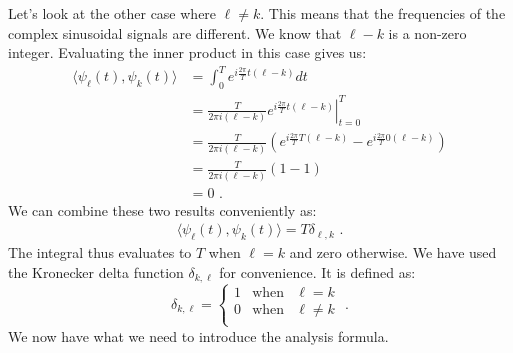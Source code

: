 Let's look at the other case where $\ell \ne k$. This means that the frequencies of the complex
sinusoidal signals are different. We know that $\ell - k$ is a non-zero integer.
Evaluating the inner product in this case gives us:
\begin{align}
  \langle \psi_\ell(t), \psi_k(t) \rangle & = \int_0^T  e^{i\frac{2\pi}{T}t(\ell-k)} dt                                                           \\
                                          & = \left.\frac{T}{2\pi i (\ell-k)} e^{i\frac{2\pi}{T}t(\ell-k)} \right\vert_{t=0}^{T}                  \\
                                          & = \frac{T}{2\pi i (\ell-k)}\left( e^{i\frac{2\pi}{T}T(\ell-k)} - e^{i\frac{2\pi}{T}0(\ell-k)} \right) \\
                                          & = \frac{T}{2\pi i (\ell-k)}( 1 - 1 )                                                                  \\
                                          & = 0 \,\,.
\end{align}
We can combine these two results conveniently as:
\begin{align}
  \langle \psi_\ell(t), \psi_k(t) \rangle = T\delta_{\ell,k} \,\,.
\end{align}
The integral thus evaluates to $T$ when $\ell=k$ and zero otherwise. We have used
the Kronecker delta function $\delta_{k,\ell}$ for convenience. It is defined as:
\begin{equation}
  \delta_{k,\ell} = \left\{
  \begin{array}{rcr}
    1 & \mathrm{when} & \ell=k     \\
    0 & \mathrm{when} & \ell \ne k \\
  \end{array}\right.\,\,.
\end{equation}
We now have what we need to introduce the analysis formula.

